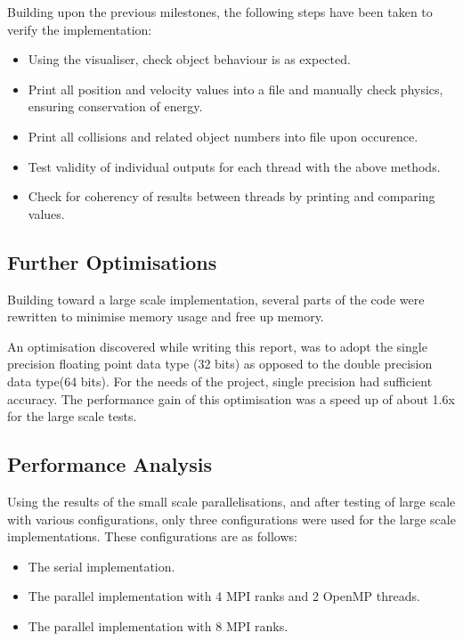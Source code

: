 \documentclass[twoside,twocolumn]{article}
\begin{document}
	
		Building upon the previous milestones, the following steps have been taken to verify the implementation: \newline
		
		\begin{itemize}
			\item Using the visualiser, check object behaviour is as expected. 
			\item Print all position and velocity values into a file and manually check physics, ensuring conservation of energy.
			\item Print all collisions and related object numbers into file upon occurence.
			\item Test validity of individual outputs for each thread with the above methods.
			\item Check for coherency of results between threads by printing and comparing values.
		\end{itemize}

	\subsection{Further Optimisations}
	Building toward a large scale implementation, several parts of the code were rewritten to minimise memory usage and free up memory. \newline
	
	An optimisation discovered while writing this report, was to adopt the single precision floating point data type (32 bits) as opposed to the double precision data type(64 bits). For the needs of the project, single precision had sufficient accuracy. The performance gain of this optimisation was a speed up of about 1.6x for the large scale tests.
	
	\subsection{Performance Analysis}

	Using the results of the small scale parallelisations, and after testing of large scale with various configurations, only three configurations were used for the large scale implementations. These configurations are as follows: \newline
	\begin{itemize}
		\item The serial implementation.
		\item The parallel implementation with 4 MPI ranks and 2 OpenMP threads.
		\item The parallel implementation with 8 MPI ranks.
	\end{itemize}
	
\end{document}
